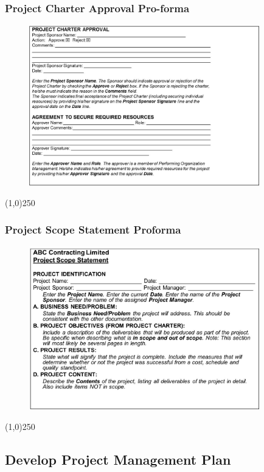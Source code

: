 \begin{frame}
\frametitle{Project Charter Approval Pro-forma}
\begin{figure}
	\centering
		\includegraphics[width = 10cm]{images/charter3.jpg}
	\label{fig:charter3}
\end{figure}
\end{frame}\begin{center}\line(1,0){250}\end{center}
%
%

\begin{frame}
\frametitle{Project Scope Statement Proforma}
\begin{figure}
	\centering
		\includegraphics[width = 10cm]{images/scopestmt.jpg}
	\label{fig:scope}
\end{figure}
\end{frame}\begin{center}\line(1,0){250}\end{center}
%
%







\subsection{Develop Project Management Plan}


